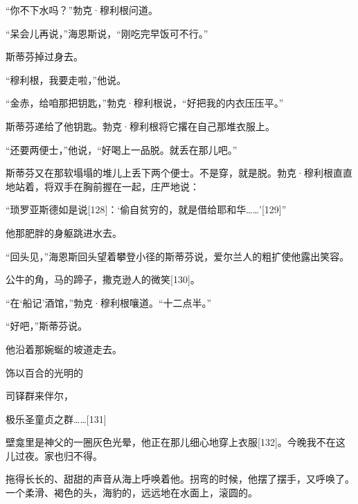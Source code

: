 \documentclass{article}
\begin{document}
“你不下水吗？”勃克·穆利根问道。



“呆会儿再说，”海恩斯说，“刚吃完早饭可不行。”



斯蒂芬掉过身去。



“穆利根，我要走啦，”他说。



“金赤，给咱那把钥匙，”勃克·穆利根说，“好把我的内衣压压平。”



斯蒂芬递给了他钥匙。勃克·穆利根将它撂在自己那堆衣服上。



“还要两便士，”他说，“好喝上一品脱。就丢在那儿吧。”



斯蒂芬又在那软塌塌的堆儿上丢下两个便士。不是穿，就是脱。勃克·穆利根直直地站着，将双手在胸前握在一起，庄严地说：



“琐罗亚斯德如是说[128]：‘偷自贫穷的，就是借给耶和华……’[129]”



他那肥胖的身躯跳进水去。



“回头见，”海恩斯回头望着攀登小径的斯蒂芬说，爱尔兰人的粗扩使他露出笑容。



公牛的角，马的蹄子，撒克逊人的微笑[130]。



“在‘船记’酒馆，”勃克·穆利根嚷道。“十二点半。”



“好吧，”斯蒂芬说。



他沿着那婉蜒的坡道走去。



饰以百合的光明的



司铎群来伴尔，



极乐圣童贞之群……[131]



壁龛里是神父的一圈灰色光晕，他正在那儿细心地穿上衣服[132]。今晚我不在这儿过夜。家也归不得。



拖得长长的、甜甜的声音从海上呼唤着他。拐弯的时候，他摆了摆手，又呼唤了。一个柔滑、褐色的头，海豹的，远远地在水面上，滚圆的。
\end{document}
